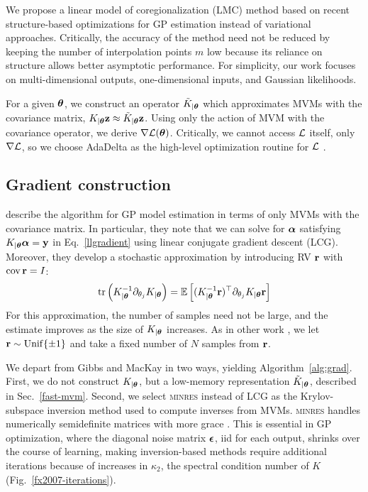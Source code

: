 \documentclass{article}
\begin{document}
We propose a linear model of coregionalization (LMC) method based on recent structure-based optimizations for GP estimation instead of variational approaches. Critically, the accuracy of the method need not be reduced by keeping the number of interpolation points $m$ low because its reliance on structure allows better asymptotic performance.
For simplicity, our work focuses on multi-dimensional outputs, one-dimensional inputs, and Gaussian likelihoods.

For a given ${\boldsymbol\theta}$, we construct an operator $\tilde{K}_{|{\boldsymbol\theta}}$ which approximates MVMs with the covariance matrix, $K_{|{\boldsymbol\theta}}\textbf{z}\approx \tilde{K}_{|{\boldsymbol\theta}}\textbf{z}$. Using only the action of MVM with the covariance operator, we derive $\nabla\mathcal{L}({\boldsymbol\theta})$. Critically, we cannot access $\mathcal{L}$ itself, only $\nabla\mathcal{L}$, so we choose AdaDelta as the high-level optimization routine for $\mathcal{L}$ \cite{zeiler2012adadelta}.

\subsection{Gradient construction}

\citet{gibbs1996cient} describe the algorithm for GP model estimation in terms of only MVMs with the covariance matrix. In particular, they note that we can solve for ${\boldsymbol\alpha}$ satisfying $K_{|{\boldsymbol\theta}}{\boldsymbol\alpha}=\textbf{y}$ in Eq.~\ref{llgradient} using linear conjugate gradient descent (LCG). Moreover, they develop a stochastic approximation by introducing RV ${\textbf{r}}$ with $\operatorname{cov} {\textbf{r}}=I$:
\begin{align}
  \operatorname{tr}\left({K_{|{\boldsymbol\theta}}^{-1}\partial_{\theta_j}K_{|{\boldsymbol\theta}}}\right) = \operatorname{\mathbb{E}}\left[(K_{|{\boldsymbol\theta}}^{-1}{\textbf{r}})^\top\partial_{\theta_j}K_{|{\boldsymbol\theta}}{\textbf{r}}\right]\label{eq:trace}
\end{align}
For this approximation, the number of samples need not be large, and the estimate improves as the size of $K_{|{\boldsymbol\theta}}$ increases.
As in other work \cite{cutajar2016preconditioning}, we let ${\textbf{r}}\sim\operatorname{Unif}\{\pm 1\}$ and take a fixed number of $N$ samples from ${\textbf{r}}$.

We depart from Gibbs and MacKay in two ways, yielding Algorithm~\ref{alg:grad}. First, we do not construct $K_{|{\boldsymbol\theta}}$, but a low-memory representation $\tilde{K}_{|{\boldsymbol\theta}}$, described in Sec.~\ref{fast-mvm}. Second, we select \textsc{minres} instead of LCG as the Krylov-subspace inversion method used to compute inverses from MVMs. \textsc{minres} handles numerically semidefinite matrices with more grace \cite{fong2012cg}. This is essential in GP optimization, where the diagonal noise matrix ${\boldsymbol\epsilon}$, iid for each output, shrinks over the course of learning, making inversion-based methods require additional iterations because of increases in $\kappa_2$, the spectral condition number of $K$ (Fig.~\ref{fx2007-iterations}).
\end{document}
